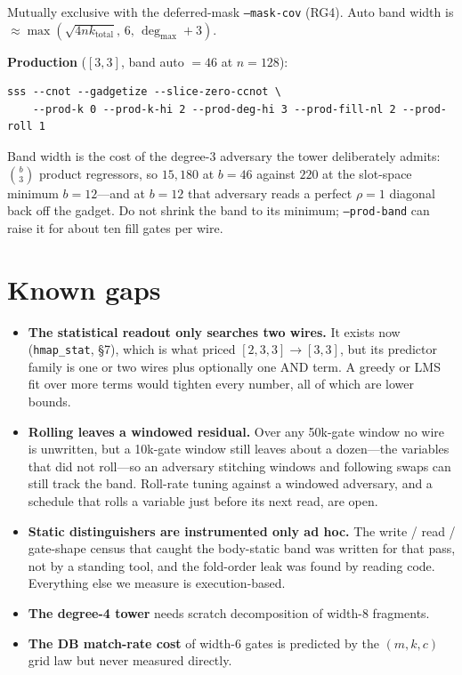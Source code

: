 \documentclass[11pt]{article}
\begin{document}
Mutually exclusive with the deferred-mask \texttt{--mask-cov} (RG4).
Auto band width is ${\approx}\max(\sqrt{4nk_{\mathrm{total}}},\,6,\,\deg_{\max}+3)$.

\textbf{Production} ($[3,3]$, band auto $= 46$ at $n{=}128$):
\begin{verbatim}
sss --cnot --gadgetize --slice-zero-ccnot \
    --prod-k 0 --prod-k-hi 2 --prod-deg-hi 3 --prod-fill-nl 2 --prod-roll 1
\end{verbatim}
Band width is the cost of the degree-3 adversary the tower deliberately admits:
$\binom{b}{3}$ product regressors, so $15{,}180$ at $b{=}46$ against $220$ at the
slot-space minimum $b{=}12$---and at $b{=}12$ that adversary reads a perfect
$\rho{=}1$ diagonal back off the gadget. Do not shrink the band to its minimum;
\texttt{--prod-band} can raise it for about ten fill gates per wire.

\section{Known gaps}

\begin{itemize}
\item \textbf{The statistical readout only searches two wires.} It exists now
(\texttt{hmap\_stat}, \S7), which is what priced $[2,3,3] \to [3,3]$, but its
predictor family is one or two wires plus optionally one AND term. A greedy or
LMS fit over more terms would tighten every number, all of which are lower
bounds.
\item \textbf{Rolling leaves a windowed residual.} Over any 50k-gate window no
wire is unwritten, but a 10k-gate window still leaves about a dozen---the
variables that did not roll---so an adversary stitching windows and following
swaps can still track the band. Roll-rate tuning against a windowed adversary,
and a schedule that rolls a variable just before its next read, are open.
\item \textbf{Static distinguishers are instrumented only ad hoc.} The write /
read / gate-shape census that caught the body-static band was written for that
pass, not by a standing tool, and the fold-order leak was found by reading code.
Everything else we measure is execution-based.
\item \textbf{The degree-4 tower} needs scratch decomposition of width-8
fragments.
\item \textbf{The DB match-rate cost} of width-6 gates is predicted by the
$(m,k,c)$ grid law but never measured directly.
\end{itemize}
\end{document}
